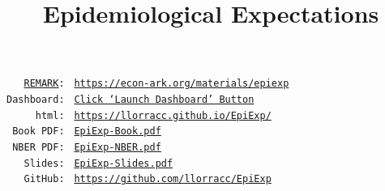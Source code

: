 {    \title{Epidemiological Expectations}
    \renewcommand{\forcedate}{March 19, 2022}
    \maketitle
    \hypertarget{abstract}{}
    \begin{abstract}
      
    \end{abstract}
    \vspace{0.5in}
    \providecommand{\owner}{llorracc}
    \renewcommand{\owner}{llorracc}
    \newcommand{\REMARK}{\href{https://github.com/econ-ark/REMARK}{REMARK}}
    \begin{small}
      \parbox{0.9\textwidth}{
        \begin{center}
          \begin{tabbing}
            \texttt{~~~\REMARK:~} \= \= \texttt{\url{https://econ-ark.org/materials/epiexp}} \\
            \texttt{Dashboard:~} \> \> \texttt{\href{https://econ-ark.org/materials/epiexp?launch}{Click `Launch Dashboard' Button}} \\
            \texttt{~~~~~html:~} \> \> \texttt{\href{https://\owner.github.io/EpiExp}{https://\owner.github.io/EpiExp/}} \\ %
            \texttt{~Book~PDF:~} \> \> \texttt{\href{https://github.com/\owner/EpiExp/blob/master/docs/EpiExp-Book.pdf}{EpiExp-Book.pdf}} \\
            \texttt{~NBER~PDF:~} \> \> \texttt{\href{https://github.com/\owner/EpiExp/blob/master/docs/EpiExp-NBER.pdf}{EpiExp-NBER.pdf}} \\
            \texttt{~~~Slides:~} \> \> \texttt{\href{https://github.com/\owner/EpiExp/blob/master/docs/EpiExp-Slides.pdf}{EpiExp-Slides.pdf}} \\
            \texttt{~~~GitHub:~} \> \> \texttt{\href{https://github.com/\owner/EpiExp}{https://github.com/\owner/EpiExp}} \\
          \end{tabbing}
        \end{center}
      }
    \end{small}

    \begin{authorsinfo}
    \end{authorsinfo}

}

